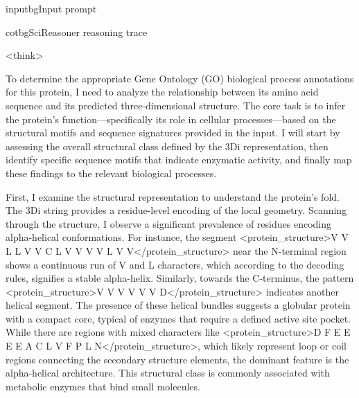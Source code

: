 \begin{appendices}
\begin{fullcotsection}{inputbg}{Input prompt}
\begin{cotverbatim}
\end{cotverbatim}

\end{fullcotsection}

\par\medskip

\begin{fullcotsection}{cotbg}{SciReasoner reasoning trace}

\begin{cotverbatim}

<think>

To determine the appropriate Gene Ontology (GO) biological process annotations for this protein, I need to analyze the relationship between its amino acid sequence and its predicted three-dimensional structure. The core task is to infer the protein's function---specifically its role in cellular processes---based on the structural motifs and sequence signatures provided in the input. I will start by assessing the overall structural class defined by the 3Di representation, then identify specific sequence motifs that indicate enzymatic activity, and finally map these findings to the relevant biological processes.

First, I examine the structural representation to understand the protein's fold. The 3Di string provides a residue-level encoding of the local geometry. Scanning through the structure, I observe a significant prevalence of residues encoding alpha-helical conformations. For instance, the segment <protein_structure>V V L L V V C L V V V V L V V</protein_structure> near the N-terminal region shows a continuous run of V and L characters, which according to the decoding rules, signifies a stable alpha-helix. Similarly, towards the C-terminus, the pattern <protein_structure>V V V V V V D</protein_structure> indicates another helical segment. The presence of these helical bundles suggests a globular protein with a compact core, typical of enzymes that require a defined active site pocket. While there are regions with mixed characters like <protein_structure>D F E E E E A C L V F P L N</protein_structure>, which likely represent loop or coil regions connecting the secondary structure elements, the dominant feature is the alpha-helical architecture. This structural class is commonly associated with metabolic enzymes that bind small molecules.


\end{cotverbatim}
\end{fullcotsection}
\end{appendices}
